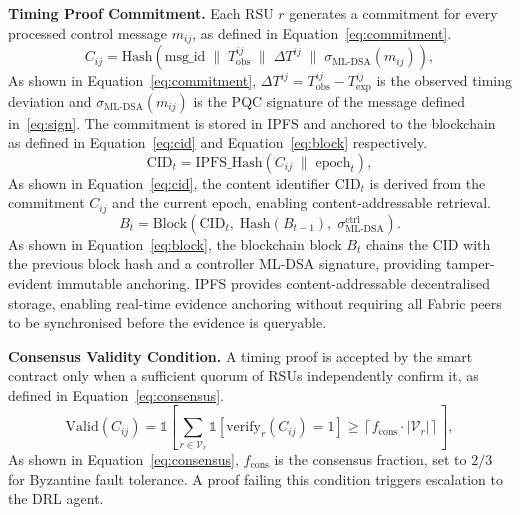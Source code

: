 \textbf{Timing Proof Commitment.}
Each RSU $r$ generates a commitment for every processed control
message $m_{ij}$, as defined in Equation~\eqref{eq:commitment}.
\begin{equation}
C_{ij} = \mathrm{Hash}\!\left(
  \mathrm{msg\_id} \;\|\;
  T_{\mathrm{obs}}^{ij} \;\|\;
  \Delta T^{ij} \;\|\;
  \sigma_{\mathrm{ML\text{-}DSA}}(m_{ij})
\right),
\label{eq:commitment}
\end{equation}
As shown in Equation~\eqref{eq:commitment}, $\Delta T^{ij} =
T_{\mathrm{obs}}^{ij} - T_{\mathrm{exp}}^{ij}$ is the observed
timing deviation and $\sigma_{\mathrm{ML\text{-}DSA}}(m_{ij})$
is the PQC signature of the message defined in~\eqref{eq:sign}.
The commitment is stored in IPFS and anchored to the blockchain
as defined in Equation~\eqref{eq:cid} and
Equation~\eqref{eq:block} respectively.
\begin{equation}
\mathrm{CID}_t = \mathrm{IPFS\_Hash}(C_{ij} \;\|\; \mathrm{epoch}_t),
\label{eq:cid}
\end{equation}
As shown in Equation~\eqref{eq:cid}, the content identifier
$\mathrm{CID}_t$ is derived from the commitment $C_{ij}$ and
the current epoch, enabling content-addressable retrieval.
\begin{equation}
B_t = \mathrm{Block}\!\left(
  \mathrm{CID}_t,\;
  \mathrm{Hash}(B_{t-1}),\;
  \sigma_{\mathrm{ML\text{-}DSA}}^{\mathrm{ctrl}}
\right).
\label{eq:block}
\end{equation}
As shown in Equation~\eqref{eq:block}, the blockchain block
$B_t$ chains the CID with the previous block hash and a
controller ML-DSA signature, providing tamper-evident immutable
anchoring. IPFS provides content-addressable decentralised
storage, enabling real-time evidence anchoring without requiring
all Fabric peers to be synchronised before the evidence is
queryable.

\textbf{Consensus Validity Condition.}
A timing proof is accepted by the smart contract only when a
sufficient quorum of RSUs independently confirm it, as defined
in Equation~\eqref{eq:consensus}.
\begin{equation}
\mathrm{Valid}(C_{ij}) =
  \mathbb{1}\!\left[
    \sum_{r\in\mathcal{V}_r}
    \mathbb{1}[\mathrm{verify}_r(C_{ij})=1]
    \geq
    \left\lceil f_{\mathrm{cons}}\cdot|\mathcal{V}_r|\right\rceil
  \right],
\label{eq:consensus}
\end{equation}
As shown in Equation~\eqref{eq:consensus}, $f_{\mathrm{cons}}$
is the consensus fraction, set to $2/3$ for Byzantine fault
tolerance. A proof failing this condition triggers escalation
to the DRL agent.

